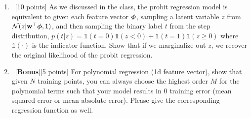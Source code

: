 \documentclass[12pt, fullpage,letterpaper]{article}
\begin{document}
\begin{enumerate}
\item~[10 points] As we discussed in the class, the probit regression model is equivalent to given each feature vector $\boldsymbol{\phi}$, sampling a latent variable $z$ from $\mathcal{N}(z|{\bf w}^\top \boldsymbol{\phi},1)$,  and then sampling the binary label $t$ from the step distribution, $p(t|z) = \mathds{1}(t=0)\mathds{1}(z< 0) + \mathds{1}(t=1)\mathds{1}(z\ge 0)$ where $\mathds{1}(\cdot)$ is the indicator function. Show that if we marginalize out $z$, we recover the original likelihood of the probit regression.  
\item~[\textbf{Bonus}][5 points] For polynomial regression (1d feature vector), show that given $N$ training points, you can always choose the highest order $M$ for the polynomial terms such that your model results in $0$ training error (\eg mean squared error or mean absolute error).  Please give the corresponding regression function as well.



\end{enumerate}
\end{document}
